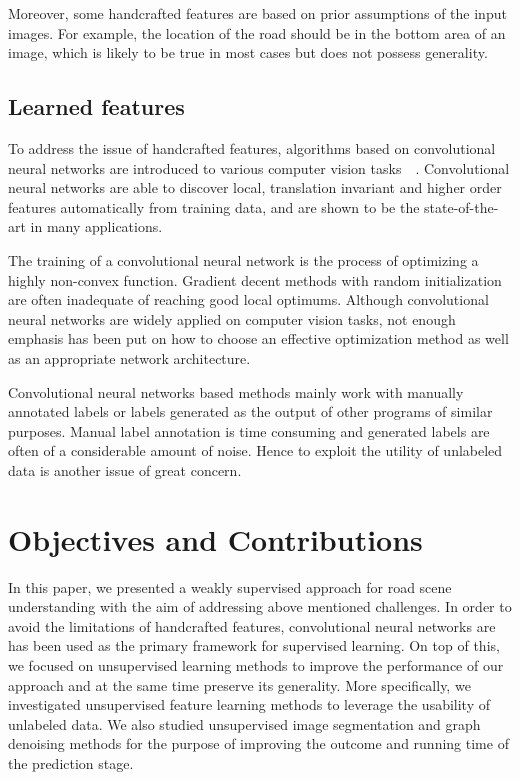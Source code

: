 Moreover, some handcrafted features are based on prior assumptions of the input images. For example, the location of the road should be in the bottom area of an image, which is likely to be true in most cases but does not possess generality.

\subsection{Learned features}
\label{sec:Learned features}
To address the issue of handcrafted features, algorithms based on convolutional neural networks are introduced to various computer vision tasks~\cite{alvarez2012road}~\cite{alvarez2012semantic}. Convolutional neural networks are able to discover local, translation invariant and higher order features automatically from training data, and are shown to be the state-of-the-art in many applications.

The training of a convolutional neural network is the process of optimizing a highly non-convex function. Gradient decent methods with random initialization are often inadequate of reaching good local optimums. Although convolutional neural networks are widely applied on computer vision tasks, not enough emphasis has been put on how to choose an effective optimization method as well as an appropriate network architecture. 

Convolutional neural networks based methods mainly work with manually annotated labels or labels generated as the output of other programs of similar purposes. Manual label annotation is time consuming and generated labels are often of a considerable amount of noise. Hence to exploit the utility of unlabeled data is another issue of great concern.

\section{Objectives and Contributions}
In this paper, we presented a weakly supervised approach for road scene understanding with the aim of addressing above mentioned challenges. In order to avoid the limitations of handcrafted features, convolutional neural networks are has been used as the primary framework for supervised learning. On top of this, we focused on unsupervised learning methods to improve the performance of our approach and at the same time preserve its generality. More specifically, we investigated unsupervised feature learning methods to leverage the usability of unlabeled data. We also studied unsupervised image segmentation and graph denoising methods for the purpose of improving the outcome and running time of the prediction stage.

